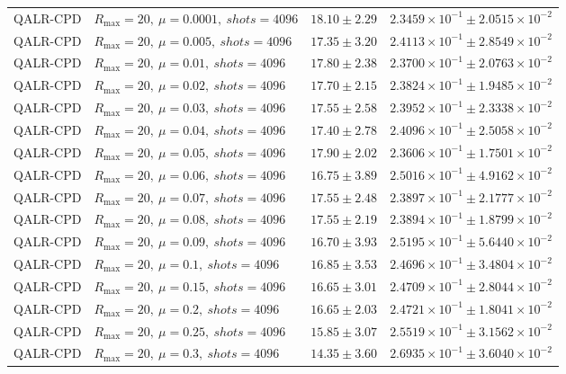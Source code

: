 \begin{table}[t]
\begin{tabular}{@{}llcc@{}}
QALR-CPD & \(R_{\max}=20,\ \mu=0.0001,\ shots=4096\) & \(18.10 \pm 2.29\) & \(2.3459{\times}10^{-1} \pm 2.0515{\times}10^{-2}\) \\
QALR-CPD & \(R_{\max}=20,\ \mu=0.005,\ shots=4096\) & \(17.35 \pm 3.20\) & \(2.4113{\times}10^{-1} \pm 2.8549{\times}10^{-2}\) \\
QALR-CPD & \(R_{\max}=20,\ \mu=0.01,\ shots=4096\) & \(17.80 \pm 2.38\) & \(2.3700{\times}10^{-1} \pm 2.0763{\times}10^{-2}\) \\
QALR-CPD & \(R_{\max}=20,\ \mu=0.02,\ shots=4096\) & \(17.70 \pm 2.15\) & \(2.3824{\times}10^{-1} \pm 1.9485{\times}10^{-2}\) \\
QALR-CPD & \(R_{\max}=20,\ \mu=0.03,\ shots=4096\) & \(17.55 \pm 2.58\) & \(2.3952{\times}10^{-1} \pm 2.3338{\times}10^{-2}\) \\
QALR-CPD & \(R_{\max}=20,\ \mu=0.04,\ shots=4096\) & \(17.40 \pm 2.78\) & \(2.4096{\times}10^{-1} \pm 2.5058{\times}10^{-2}\) \\
QALR-CPD & \(R_{\max}=20,\ \mu=0.05,\ shots=4096\) & \(17.90 \pm 2.02\) & \(2.3606{\times}10^{-1} \pm 1.7501{\times}10^{-2}\) \\
QALR-CPD & \(R_{\max}=20,\ \mu=0.06,\ shots=4096\) & \(16.75 \pm 3.89\) & \(2.5016{\times}10^{-1} \pm 4.9162{\times}10^{-2}\) \\
QALR-CPD & \(R_{\max}=20,\ \mu=0.07,\ shots=4096\) & \(17.55 \pm 2.48\) & \(2.3897{\times}10^{-1} \pm 2.1777{\times}10^{-2}\) \\
QALR-CPD & \(R_{\max}=20,\ \mu=0.08,\ shots=4096\) & \(17.55 \pm 2.19\) & \(2.3894{\times}10^{-1} \pm 1.8799{\times}10^{-2}\) \\
QALR-CPD & \(R_{\max}=20,\ \mu=0.09,\ shots=4096\) & \(16.70 \pm 3.93\) & \(2.5195{\times}10^{-1} \pm 5.6440{\times}10^{-2}\) \\
QALR-CPD & \(R_{\max}=20,\ \mu=0.1,\ shots=4096\) & \(16.85 \pm 3.53\) & \(2.4696{\times}10^{-1} \pm 3.4804{\times}10^{-2}\) \\
QALR-CPD & \(R_{\max}=20,\ \mu=0.15,\ shots=4096\) & \(16.65 \pm 3.01\) & \(2.4709{\times}10^{-1} \pm 2.8044{\times}10^{-2}\) \\
QALR-CPD & \(R_{\max}=20,\ \mu=0.2,\ shots=4096\) & \(16.65 \pm 2.03\) & \(2.4721{\times}10^{-1} \pm 1.8041{\times}10^{-2}\) \\
QALR-CPD & \(R_{\max}=20,\ \mu=0.25,\ shots=4096\) & \(15.85 \pm 3.07\) & \(2.5519{\times}10^{-1} \pm 3.1562{\times}10^{-2}\) \\
QALR-CPD & \(R_{\max}=20,\ \mu=0.3,\ shots=4096\) & \(14.35 \pm 3.60\) & \(2.6935{\times}10^{-1} \pm 3.6040{\times}10^{-2}\) \\

\end{tabular}
\end{table}
